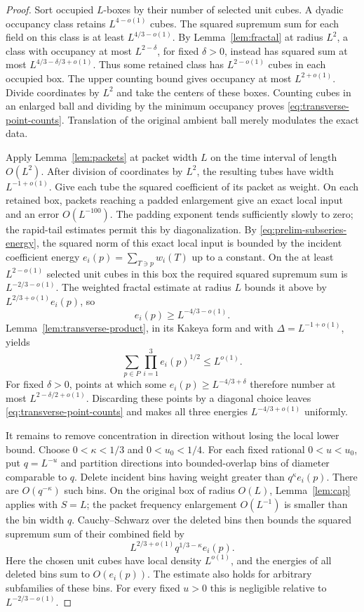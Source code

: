 \begin{proof}
Sort occupied $L$-boxes by their number of selected unit cubes.
A dyadic occupancy class retains $L^{4-o(1)}$ cubes.  The squared
supremum sum for each field on this class is at least
$L^{4/3-o(1)}$.  By Lemma~\ref{lem:fractal} at radius $L^2$, a class
with occupancy at most $L^{2-\delta}$, for fixed $\delta>0$, instead
has squared sum at most $L^{4/3-\delta/3+o(1)}$.  Thus some retained
class has $L^{2-o(1)}$ cubes in each occupied box.  The upper counting
bound gives occupancy at most $L^{2+o(1)}$.  Divide coordinates by
$L^2$ and take the centers of these boxes.  Counting cubes in an
enlarged ball and dividing by the minimum occupancy proves
\eqref{eq:transverse-point-counts}.  Translation of the original
ambient ball merely modulates the exact data.

Apply Lemma~\ref{lem:packets} at packet width $L$ on the time
interval of length $O(L^2)$.  After division of coordinates by $L^2$,
the resulting tubes have width $L^{-1+o(1)}$.  Give each tube the
squared coefficient of its packet as weight.  On each retained box,
packets reaching a padded enlargement give an exact local input and
an error $O(L^{-100})$.  The padding exponent tends sufficiently
slowly to zero; the rapid-tail estimates permit this by diagonalization.
By \eqref{eq:prelim-subseries-energy}, the squared norm of this
exact local input is bounded by the incident coefficient energy
$e_i(p)=\sum_{T\ni p}w_i(T)$ up to a constant.  On the at least
$L^{2-o(1)}$ selected unit cubes in this box the required squared
supremum sum is $L^{-2/3-o(1)}$.  The weighted fractal estimate at
radius $L$ bounds it above by $L^{2/3+o(1)}e_i(p)$, so
\[
 e_i(p)\ge L^{-4/3-o(1)}.
\]
Lemma~\ref{lem:transverse-product}, in its Kakeya form and with
$\Delta=L^{-1+o(1)}$, yields
\[
 \sum_{p\in P}\prod_{i=1}^3e_i(p)^{1/2}\le L^{o(1)}.
\]
For fixed $\delta>0$, points at which some
$e_i(p)\ge L^{-4/3+\delta}$ therefore number at most
$L^{2-\delta/2+o(1)}$.  Discarding these points by a diagonal choice
leaves \eqref{eq:transverse-point-counts} and makes all three energies
$L^{-4/3+o(1)}$ uniformly.

It remains to remove concentration in direction without losing the
local lower bound.  Choose $0<\kappa<1/3$ and $0<u_0<1/4$.
For each fixed rational $0<u<u_0$, put $q=L^{-u}$ and partition
directions into bounded-overlap bins of diameter comparable to $q$.
Delete incident bins having weight greater than $q^\kappa e_i(p)$.
There are $O(q^{-\kappa})$ such bins.  On the original box of radius
$O(L)$, Lemma~\ref{lem:cap} applies with $S=L$; the packet frequency
enlargement $O(L^{-1})$ is smaller than the bin width $q$.
Cauchy--Schwarz over the deleted bins then bounds the squared
supremum sum of their combined field by
\[
 L^{2/3+o(1)}q^{1/3-\kappa}e_i(p).
\]
Here the chosen unit cubes have local density $L^{o(1)}$, and the
energies of all deleted bins sum to $O(e_i(p))$.  The estimate also
holds for arbitrary subfamilies of these bins.  For every fixed $u>0$
this is negligible relative to $L^{-2/3-o(1)}$.


\end{proof}
